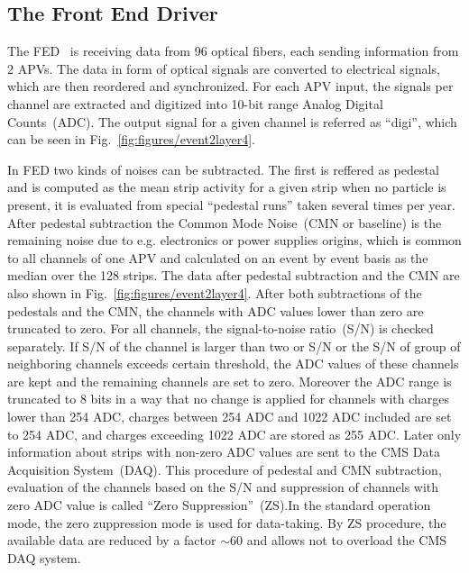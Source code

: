 
\subsection{The Front End Driver}


The FED~\cite{Baird:2002wg} is receiving data from 96 optical fibers, each sending information from 2 APVs. The data in form of optical signals are converted to electrical signals, which are then reordered and synchronized. For each APV input, the signals per channel are extracted and digitized into 10-bit range Analog Digital Counts~(ADC). The output signal for a given channel is referred as ``digi'', which can be seen in Fig.~\ref{fig:figures/event2layer4}. 

In FED two kinds of noises can be subtracted. The first is reffered as pedestal and is computed as the mean strip activity for a given strip when no particle is present, it is evaluated from special ``pedestal runs'' taken several times per year. After pedestal subtraction the Common Mode Noise~(CMN or baseline) is the remaining noise due to e.g. electronics or power supplies origins, which is common to all channels of one APV and calculated on an  event by event basis as the median over the 128 strips. The data after pedestal subtraction and the CMN are also shown in Fig.~\ref{fig:figures/event2layer4}. After both subtractions of the pedestals and the CMN, the channels with ADC values lower than zero are truncated to zero. For all channels, the signal-to-noise ratio~(S/N) is checked separately. If S/N of the channel is larger than two or S/N or the S/N of group of neighboring channels exceeds certain threshold, the ADC values of these channels are kept and the remaining channels are set to zero. Moreover the ADC range is truncated to 8 bits in a way that no change is applied for channels with charges lower than 254 ADC, charges between 254 ADC and 1022 ADC included are set to 254 ADC, and charges exceeding 1022 ADC are stored as 255 ADC. Later only information about strips with non-zero ADC values are sent to the CMS Data Acquisition System~(DAQ).  This procedure of pedestal and CMN subtraction, evaluation of the channels based on the S/N and suppression of channels with zero ADC value is called ``Zero Suppression''~(ZS).In the standard operation mode, the zero zuppression mode is used for data-taking. By ZS procedure, the available data are reduced by a factor $\sim$60 and allows not to overload the CMS DAQ system.

